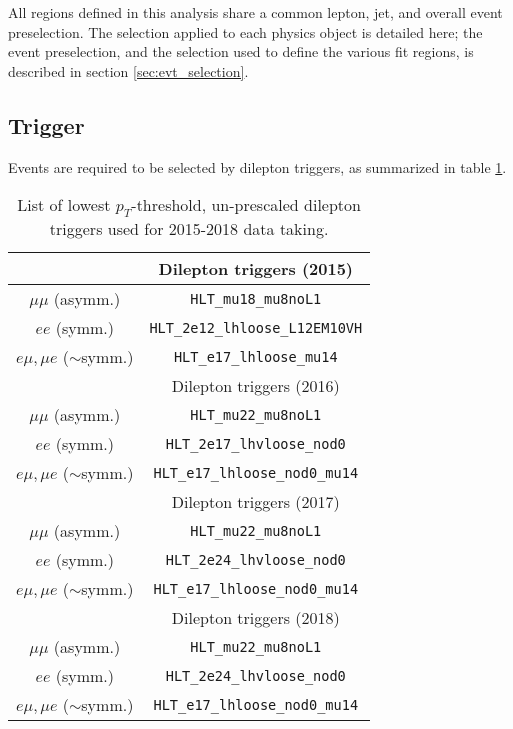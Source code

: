 
All regions defined in this analysis share a common lepton, jet, and overall event preselection. The selection applied to each physics object is detailed here; the event preselection, and the selection used to define the various fit regions, is described in section \ref{sec:evt_selection}.

\subsection{Trigger}

Events are required to be selected by dilepton triggers, as summarized in table \ref{tbl:trigger}. 

\begin{table}[H]
 \begin{center}
   \begin{tabular}{cc}
     \toprule
                  & Dilepton triggers (2015) \\
     \midrule
      $\mu\mu$ (asymm.)          & \verb!HLT_mu18_mu8noL1! \\
      $ee$ (symm.)               & \verb!HLT_2e12_lhloose_L12EM10VH! \\
      $e\mu,\mu e$ ($\sim$symm.) & \verb!HLT_e17_lhloose_mu14! \\
     \bottomrule
                       & Dilepton triggers (2016) \\
     \midrule
      $\mu\mu$ (asymm.)                   & \verb!HLT_mu22_mu8noL1! \\
      $ee$ (symm.)                        & \verb!HLT_2e17_lhvloose_nod0! \\
      $e\mu,\mu e$ ($\sim$symm.)          & \verb!HLT_e17_lhloose_nod0_mu14! \\
     \bottomrule

                  & Dilepton triggers (2017) \\
     \midrule
      $\mu\mu$ (asymm.)                   & \verb!HLT_mu22_mu8noL1! \\
      $ee$ (symm.)                        & \verb!HLT_2e24_lhvloose_nod0! \\
      $e\mu,\mu e$ ($\sim$symm.)          & \verb!HLT_e17_lhloose_nod0_mu14! \\
     \bottomrule
                  & Dilepton triggers (2018) \\
     \midrule
      $\mu\mu$ (asymm.)                   & \verb!HLT_mu22_mu8noL1! \\
      $ee$ (symm.)                        & \verb!HLT_2e24_lhvloose_nod0! \\
      $e\mu,\mu e$ ($\sim$symm.)          & \verb!HLT_e17_lhloose_nod0_mu14! \\ 
      \bottomrule
   \end{tabular}
   \caption{\label{tbl:trigger} List of lowest $p_{T}$-threshold, un-prescaled dilepton triggers used for 2015-2018 data taking.}
 \end{center}
\end{table}

